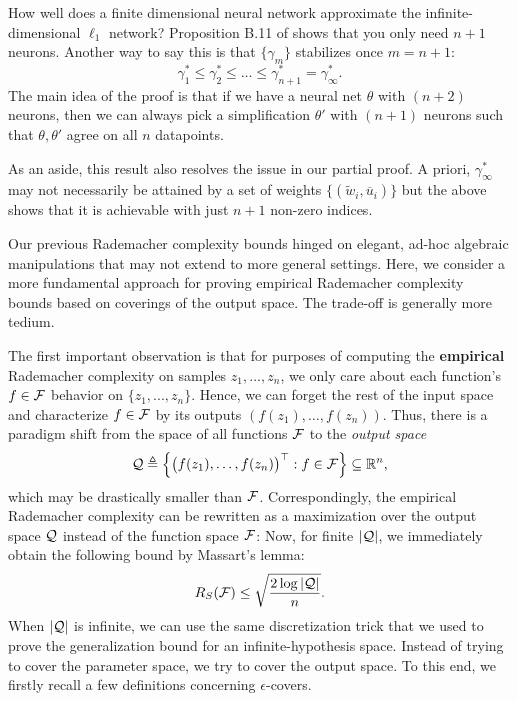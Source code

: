\begin{remark}
How well does a finite dimensional neural network approximate the infinite-dimensional $\ell_1$ network? Proposition B.11 of \cite{wei2020regularization} shows that you only need $n+1$ neurons. Another way to say this is that $\{\gamma_m\}$ stabilizes once $m=n+1$:
\begin{equation}
\gamma_1^* \le \gamma_2^* \le \dots \le \gamma_{n+1}^* = \gamma_\infty^*.
\end{equation}
The main idea of the proof is that if we have a neural net $\theta$ with $(n+2)$ neurons, then we can always pick a simplification $\theta'$ with $(n+1)$ neurons such that $\theta,\theta'$ agree on all $n$ datapoints.

As an aside, this result also resolves the issue in our partial proof. A priori, $\gamma_{\infty}^*$ may not necessarily be attained by a set of weights $\{(\widetilde w_i, \overline u_i)\}$ but the above shows that it is achievable with just $n+1$ non-zero indices.

\end{remark}

Our previous Rademacher complexity bounds hinged on elegant, ad-hoc algebraic manipulations that may not extend to more general settings. Here, we consider a more fundamental approach for proving empirical Rademacher complexity bounds based on coverings of the output space. The trade-off is generally more tedium.

The first important observation is that for purposes of computing the \textbf{empirical} Rademacher complexity on samples $z_1, ..., z_n$, 
we only care about each function's $f \in \mathcal F$ behavior on $\{z_1, ..., z_n\}$. Hence, we can forget the rest of the input space and characterize $f \in \mathcal F$ by its outputs $(f(z_1),\dots, f(z_n))$. Thus, there is a paradigm shift from the space of all functions $\mathcal F$ to the \textit{output space}
\begin{equation}
\mathcal Q \triangleq \left\{ \begin{pmatrix} f(z_1), \dots, f(z_n) \end{pmatrix}^\top: f\in \mathcal F\right\} \subseteq \mathbb R^n,
\end{equation}
which may be drastically smaller than $\mathcal F$. Correspondingly, the empirical Rademacher complexity can be rewritten as a maximization over the output space $\mathcal Q$ instead of the function space $\mathcal F$: 
Now, for finite $|\mathcal Q|$, we immediately obtain the following bound by Massart's lemma:
\begin{equation}
R_S(\mathcal F) \le \sqrt{\frac {2\log|\mathcal Q|} n}.
\end{equation}
When $|\mathcal Q|$ is infinite, we can use the same discretization trick that we used to prove the generalization bound for an infinite-hypothesis space. Instead of trying to cover the parameter space, we try to cover the output space. To this end, we firstly recall a few definitions concerning $\epsilon$-covers.

